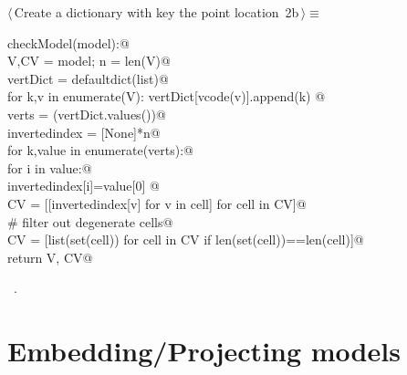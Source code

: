 \documentclass[11pt,oneside]{article}	%
\begin{document}
\begin{flushleft} \small \label{scrap3}
\protect{}$\langle\,$Create a dictionary with key the point location\nobreak\ {\footnotesize 2b}$\,\rangle\equiv$
\vspace{-1ex}
\begin{list}{}{} \item
\mbox{}\verb@def checkModel(model):@\\
\mbox{}\verb@   V,CV = model; n = len(V)@\\
\mbox{}\verb@   vertDict = defaultdict(list)@\\
\mbox{}\verb@   for k,v in enumerate(V): vertDict[vcode(v)].append(k) @\\
\mbox{}\verb@   verts = (vertDict.values())@\\
\mbox{}\verb@   invertedindex = [None]*n@\\
\mbox{}\verb@   for k,value in enumerate(verts):@\\
\mbox{}\verb@      for i in value:@\\
\mbox{}\verb@         invertedindex[i]=value[0]  @\\
\mbox{}\verb@   CV = [[invertedindex[v] for v in cell] for cell in CV]@\\
\mbox{}\verb@   # filter out degenerate cells@\\
\mbox{}\verb@   CV = [list(set(cell)) for cell in CV if len(set(cell))==len(cell)]@\\
\mbox{}\verb@   return V, CV@\\
\mbox{}\verb@@{\NWsep}
\end{list}
\vspace{-1ex}
\footnotesize\addtolength{\baselineskip}{-1ex}
\begin{list}{}{\setlength{\itemsep}{-\parsep}\setlength{\itemindent}{-\leftmargin}}
\item \NWtxtMacroRefIn\ .
\end{list}
\end{flushleft}


\section{Embedding/Projecting models}
\end{document}
